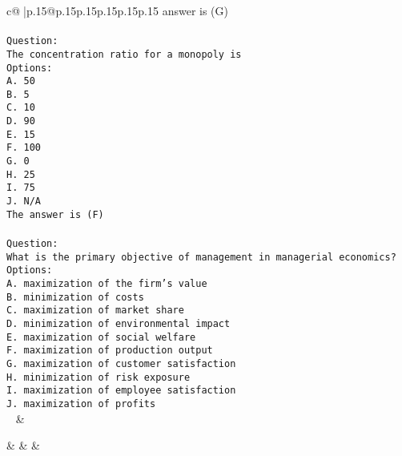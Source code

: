 \documentclass{article}
\begin{document}
{\begin{supertabular}{c@{$\;$}|p{.15\linewidth}@{}p{.15\linewidth}p{.15\linewidth}p{.15\linewidth}p{.15\linewidth}p{.15\linewidth}}
{{{answer is (G)\\ \tt \\ \tt Question:\\ \tt The concentration ratio for a monopoly is\\ \tt Options:\\ \tt A. 50\\ \tt B. 5\\ \tt C. 10\\ \tt D. 90\\ \tt E. 15\\ \tt F. 100\\ \tt G. 0\\ \tt H. 25\\ \tt I. 75\\ \tt J. N/A\\ \tt The answer is (F)\\ \tt \\ \tt Question:\\ \tt What is the primary objective of management in managerial economics?\\ \tt Options:\\ \tt A. maximization of the firm's value\\ \tt B. minimization of costs\\ \tt C. maximization of market share\\ \tt D. minimization of environmental impact\\ \tt E. maximization of social welfare\\ \tt F. maximization of production output\\ \tt G. maximization of customer satisfaction\\ \tt H. minimization of risk exposure\\ \tt I. maximization of employee satisfaction\\ \tt J. maximization of profits\\ \tt  
	  } 
	   } 
	   } 
	 & \\ 
 

    \theutterance {}  

    &  
	 & & \\ 
 


\end{supertabular}}
\end{document}

